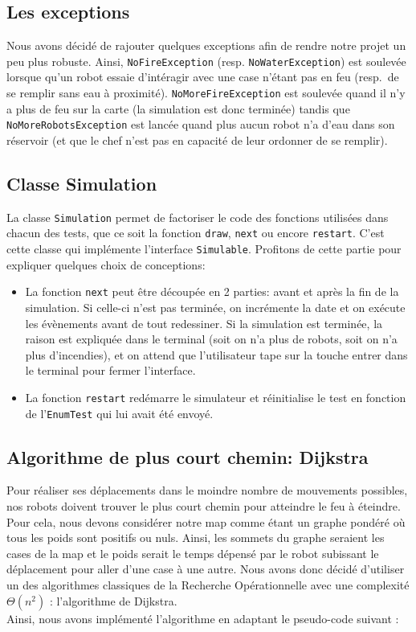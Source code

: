\documentclass[a4paper,10pt]{article} %
\begin{document}
\subsection{Les exceptions}

Nous avons décidé de rajouter quelques exceptions afin de rendre notre projet un peu plus robuste. 
Ainsi, {\tt NoFireException} (resp. {\tt NoWaterException}) est soulevée lorsque qu'un robot essaie d'intéragir avec une case n'étant pas en feu (resp.\ de se remplir sans eau à proximité).
{\tt NoMoreFireException} est soulevée quand il n'y a plus de feu sur la carte (la simulation est donc terminée) tandis que {\tt NoMoreRobotsException} est lancée quand plus aucun robot n'a d'eau dans son réservoir (et que le chef n'est pas en capacité de leur ordonner de se remplir).


\subsection{Classe Simulation}

La classe {\tt Simulation} permet de factoriser le code des fonctions utilisées dans chacun des tests, que ce soit la fonction {\tt draw}, {\tt next} ou encore {\tt restart}.
C'est cette classe qui implémente l'interface {\tt Simulable}.
Profitons de cette partie pour expliquer quelques choix de conceptions:
\begin{itemize}
    \item La fonction {\tt next} peut être découpée en 2 parties: avant et après la fin de la simulation. 
    Si celle-ci n'est pas terminée, on incrémente la date et on exécute les évènements avant de tout redessiner. 
    Si la simulation est terminée, la raison est expliquée dans le terminal (soit on n'a plus de robots, soit on n'a plus d'incendies), et on attend que l'utilisateur tape sur la touche entrer dans le terminal pour fermer l'interface. 
    \item La fonction {\tt restart} redémarre le simulateur et réinitialise le test en fonction de l'{\tt EnumTest} qui lui avait été envoyé. 
\end{itemize}

\subsection{Algorithme de plus court chemin: Dijkstra}

Pour réaliser ses déplacements dans le moindre nombre de mouvements possibles, nos robots doivent trouver le plus court chemin pour atteindre le feu à éteindre. 
Pour cela, nous devons considérer notre map comme étant un graphe pondéré où tous les poids sont positifs ou nuls. 
Ainsi, les sommets du graphe seraient les cases de la map et le poids serait le temps dépensé par le robot subissant le déplacement pour aller
d'une case à une autre. Nous avons donc décidé d'utiliser un des algorithmes classiques de la Recherche Opérationnelle avec une 
complexité $\Theta(n^2)$ : l'algorithme de Dijkstra. \\
Ainsi, nous avons implémenté l'algorithme en adaptant le pseudo-code suivant : \\
\end{document}

